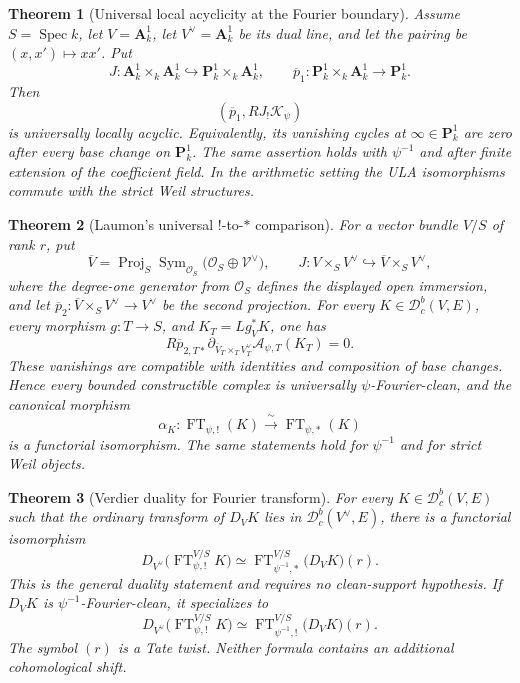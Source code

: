 \documentclass[10pt]{article}
\newtheorem{theorem}{Theorem}[section]
\theoremstyle{definition}
\newcommand{\Aone}{\mathbf A^1}
\newcommand{\Dbc}{\mathcal D^b_c}
\newcommand{\FT}{\operatorname{FT}}
\newcommand{\Spec}{\operatorname{Spec}}
\begin{document}
\begin{theorem}[Universal local acyclicity at the Fourier boundary]
Assume \(S=\Spec k\), let \(V=\Aone_k\), let \(V^\vee=\Aone_k\) be its
dual line, and let the pairing be \((x,x')\mapsto xx'\).  Put
\[
 J:\Aone_k\times_k\Aone_k
   \hookrightarrow\mathbf P^1_k\times_k\Aone_k,
 \qquad
 \overline p_1:\mathbf P^1_k\times_k\Aone_k
   \longrightarrow\mathbf P^1_k.
\]
Then
\[
 \left(\overline p_1,RJ_!\mathcal K_\psi\right)
\]
is universally locally acyclic.  Equivalently, its vanishing cycles at
\(\infty\in\mathbf P^1_k\) are zero after every base change on
\(\mathbf P^1_k\).  The same assertion holds with \(\psi^{-1}\) and after
finite extension of the coefficient field.  In the arithmetic setting the
ULA isomorphisms commute with the strict Weil structures.
\end{theorem}

\begin{theorem}[Laumon's universal \(!\)-to-\(*\) comparison]
For a vector bundle \(V/S\) of rank \(r\), put
\[
 \overline V=
 \operatorname{Proj}_S
 \operatorname{Sym}_{\mathcal O_S}
 \bigl(\mathcal O_S\oplus\mathcal V^\vee\bigr),
 \qquad
 J:V\times_SV^\vee\hookrightarrow\overline V\times_SV^\vee,
\]
where the degree-one generator from \(\mathcal O_S\) defines the displayed
open immersion, and let
\(\overline p_2:\overline V\times_SV^\vee\to V^\vee\) be the second
projection.  For every \(K\in\Dbc(V,E)\), every morphism \(g:T\to S\), and
\(K_T=Lg_V^*K\), one has
\[
 R\overline p_{2,T*}
 \partial_{\overline V_T\times_TV_T^\vee}
 \mathcal A_{\psi,T}(K_T)=0.
\]
These vanishings are compatible with identities and composition of base
changes.  Hence every bounded constructible complex is universally
\(\psi\)-Fourier-clean, and the canonical morphism
\[
 \alpha_K:\FT_{\psi,!}(K)\xrightarrow{\ \sim\ }\FT_{\psi,*}(K)
\]
is a functorial isomorphism.  The same statements hold for \(\psi^{-1}\)
and for strict Weil objects.
\end{theorem}

\begin{theorem}[Verdier duality for Fourier transform]
For every \(K\in\Dbc(V,E)\) such that the ordinary transform of \(D_VK\)
lies in \(\Dbc(V^\vee,E)\), there is a functorial isomorphism
\[
 D_{V^\vee}\bigl(\FT^{V/S}_{\psi,!}K\bigr)
 \simeq
 \FT^{V/S}_{\psi^{-1},*}\bigl(D_VK\bigr)(r).
\]
This is the general duality statement and requires no clean-support
hypothesis.  If \(D_VK\) is \(\psi^{-1}\)-Fourier-clean, it specializes to
\[
 D_{V^\vee}\bigl(\FT^{V/S}_{\psi,!}K\bigr)
 \simeq
 \FT^{V/S}_{\psi^{-1},!}\bigl(D_VK\bigr)(r).
\]
The symbol \((r)\) is a Tate twist.  Neither formula contains an additional
cohomological shift.
\end{theorem}
\end{document}
